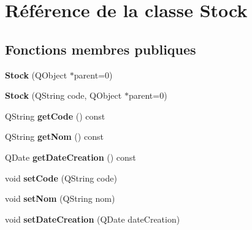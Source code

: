 \hypertarget{class_stock}{
\section{Référence de la classe Stock}
\label{d9/d1e/class_stock}
}
\subsection*{Fonctions membres publiques}
\begin{DoxyCompactItemize}
\item 
\hypertarget{class_stock_a1b90a96e24d0affdbefaa703d7ad0624}{
{\bfseries Stock} (QObject $\ast$parent=0)}
\label{d9/d1e/class_stock_a1b90a96e24d0affdbefaa703d7ad0624}

\item 
\hypertarget{class_stock_a32eaf3588908b2bd834257eb8c3c0f5d}{
{\bfseries Stock} (QString code, QObject $\ast$parent=0)}
\label{d9/d1e/class_stock_a32eaf3588908b2bd834257eb8c3c0f5d}

\item 
\hypertarget{class_stock_a262a945e9880b513402c8880123fbc66}{
QString {\bfseries getCode} () const }
\label{d9/d1e/class_stock_a262a945e9880b513402c8880123fbc66}

\item 
\hypertarget{class_stock_ac68408396104dea13130cbaf737d6087}{
QString {\bfseries getNom} () const }
\label{d9/d1e/class_stock_ac68408396104dea13130cbaf737d6087}

\item 
\hypertarget{class_stock_a01659734aa638a5317f7e2cd9fcb513d}{
QDate {\bfseries getDateCreation} () const }
\label{d9/d1e/class_stock_a01659734aa638a5317f7e2cd9fcb513d}

\item 
\hypertarget{class_stock_a0d854244a0fd26661c311bd52489bd78}{
void {\bfseries setCode} (QString code)}
\label{d9/d1e/class_stock_a0d854244a0fd26661c311bd52489bd78}

\item 
\hypertarget{class_stock_a9b1b0b47190cf10bb3b8aa114e92ac45}{
void {\bfseries setNom} (QString nom)}
\label{d9/d1e/class_stock_a9b1b0b47190cf10bb3b8aa114e92ac45}

\item 
\hypertarget{class_stock_ab5e4f1471d9f4124cd4d4b7281592f88}{
void {\bfseries setDateCreation} (QDate dateCreation)}
\label{d9/d1e/class_stock_ab5e4f1471d9f4124cd4d4b7281592f88}

\end{DoxyCompactItemize}
